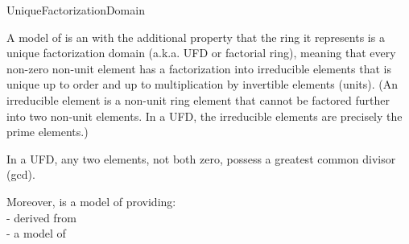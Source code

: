 \begin{ccRefConcept}{UniqueFactorizationDomain}


\ccDefinition


A model of  is an  with the 
additional property 
that the ring it represents is a unique factorization domain 
(a.k.a. UFD or factorial ring), meaning that every non-zero non-unit 
element has a factorization into irreducible elements that is unique 
up to order and up to multiplication by invertible elements (units). 
(An irreducible element is a non-unit ring element that cannot be factored 
further into two non-unit elements. In a UFD, the irreducible elements 
are precisely the prime elements.)

In a UFD, any two elements, not both zero, possess a greatest common 
divisor (gcd). 

Moreover,  
is a model of  providing:\\ 
-  
derived from  \\
-   a model of \\
  

 
\ccRefines
 
\ccSeeAlso

\\
\\
\\
\\
\\
\\
\\
\\
\\









\end{ccRefConcept}